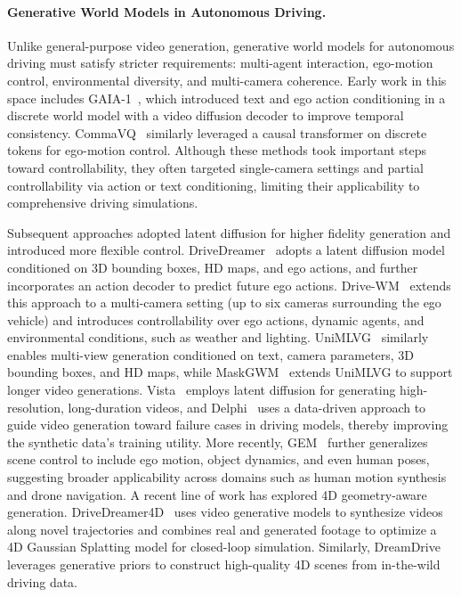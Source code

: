 \paragraph{Generative World Models in Autonomous Driving.}
Unlike general-purpose video generation, generative world models for autonomous driving must satisfy stricter requirements: multi-agent interaction, ego-motion control, environmental diversity, and multi-camera coherence. Early work in this space includes GAIA-1~\cite{gaia1-2023}, which introduced text and ego action conditioning in a discrete world model with a video diffusion decoder to improve temporal consistency. CommaVQ~\cite{comma2023vq} similarly leveraged a causal transformer on discrete tokens for ego-motion control. Although these methods took important steps toward controllability, they often targeted single-camera settings and partial controllability via action or text conditioning, limiting their applicability to comprehensive driving simulations.

Subsequent approaches adopted latent diffusion for higher fidelity generation and introduced more flexible control. DriveDreamer~\cite{wang2023drivedreamer} adopts a latent diffusion model conditioned on 3D bounding boxes, HD maps, and ego actions, and further incorporates an action decoder to predict future ego actions. Drive-WM~\cite{wang2024driving} extends this approach to a multi-camera setting (up to six cameras surrounding the ego vehicle) and introduces controllability over ego actions, dynamic agents, and environmental conditions, such as weather and lighting. UniMLVG~\cite{chen2024unimlvg} similarly enables multi-view generation conditioned on text, camera parameters, 3D bounding boxes, and HD maps, while MaskGWM~\cite{ni2025maskgwm} extends UniMLVG to support longer video generations. Vista~\cite{gao2024vista} employs latent diffusion for generating high-resolution, long-duration videos, and Delphi~\cite{ma2024unleashing} uses a data-driven approach to guide video generation toward failure cases in driving models, thereby improving the synthetic data's training utility. More recently, GEM~\cite{hassan2024gem} further generalizes scene control to include ego motion, object dynamics, and even human poses, suggesting broader applicability across domains such as human motion synthesis and drone navigation. A recent line of work has explored 4D geometry-aware generation. DriveDreamer4D~\cite{zhao2024drivedreamer4d} uses video generative models to synthesize videos along novel trajectories and combines real and generated footage to optimize a 4D Gaussian Splatting model for closed-loop simulation. Similarly, DreamDrive~\cite{mao2024dreamdrive} leverages generative priors to construct high-quality 4D scenes from in-the-wild driving data.

